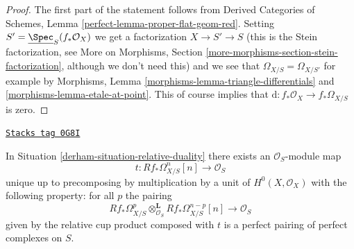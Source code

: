 \begin{proof}
The first part of the statement follows from
Derived Categories of Schemes, Lemma \ref{perfect-lemma-proper-flat-geom-red}.
Setting $S' = \underline{\Spec}_S(f_*\mathcal{O}_X)$ we get a factorization
$X \to S' \to S$ (this is the Stein factorization, see
More on Morphisms, Section \ref{more-morphisms-section-stein-factorization},
although we don't need this)
and we see that $\Omega_{X/S} = \Omega_{X/S'}$ for example by
Morphisms, Lemma \ref{morphisms-lemma-triangle-differentials} and
\ref{morphisms-lemma-etale-at-point}. This of course implies that
$\text{d} : f_*\mathcal{O}_X \to f_*\Omega_{X/S}$ is zero.
\end{proof}

\begin{lemma}
\label{derham-lemma-relative-duality-hodge}
\href{https://stacks.math.columbia.edu/tag/0G8I}{\texttt{Stacks tag 0G8I}}

In Situation \ref{derham-situation-relative-duality} there exists an
$\mathcal{O}_S$-module map
$$
t : Rf_*\Omega^n_{X/S}[n] \longrightarrow \mathcal{O}_S
$$
unique up to precomposing by multiplication by a unit of
$H^0(X, \mathcal{O}_X)$ with the following property: for all $p$ the pairing
$$
Rf_*\Omega^p_{X/S}
\otimes_{\mathcal{O}_S}^\mathbf{L}
Rf_*\Omega^{n - p}_{X/S}[n]
\longrightarrow
\mathcal{O}_S
$$
given by the relative cup product composed with $t$
is a perfect pairing of perfect complexes on $S$.
\end{lemma}

